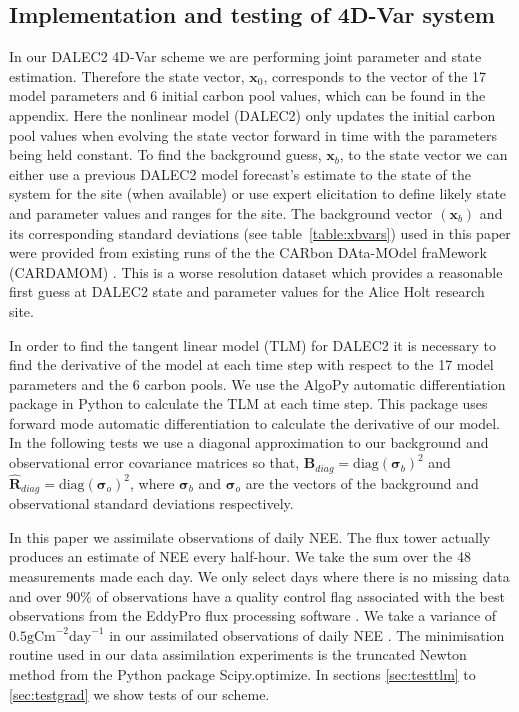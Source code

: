 \documentclass[11pt]{article}
\begin{document}
\subsection{Implementation and testing of 4D-Var system}

In our DALEC2 4D-Var scheme we are performing joint parameter and state estimation. Therefore the state vector, $\textbf{x}_0$, corresponds to the vector of the 17 model parameters and 6 initial carbon pool values, which can be found in the appendix. Here the nonlinear model (DALEC2) only updates the initial carbon pool values when evolving the state vector forward in time with the parameters being held constant. To find the background guess, $\textbf{x}_{b}$, to the state vector we can either use a previous DALEC2 model forecast's estimate to the state of the system for the site (when available) or use expert elicitation to define likely state and parameter values and ranges for the site. The background vector $(\textbf{x}_b)$ and its corresponding standard deviations (see table~\ref{table:xbvars}) used in this paper were provided from existing runs of the the CARbon DAta-MOdel fraMework (CARDAMOM) \citep{Exbrayat2015}. This is a worse resolution dataset which provides a reasonable first guess at DALEC2 state and parameter values for the Alice Holt research site.

In order to find the tangent linear model (TLM) for DALEC2 it is necessary to find the derivative of the model at each time step with respect to the 17 model parameters and the 6 carbon pools. We use the AlgoPy automatic differentiation package \citep{Walter2013} in Python to calculate the TLM at each time step. This package uses forward mode automatic differentiation to calculate the derivative of our model. In the following tests we use a diagonal approximation to our background and observational error covariance matrices so that, 
$\textbf{B}_{diag}=\text{diag}(\bm{\sigma}_b)^2$ and $\hat{\textbf{R}}_{diag}=\text{diag}(\bm{\sigma}_o )^2$,
where $\bm{\sigma}_b$ and $\bm{\sigma}_o$ are the vectors of the background and observational standard deviations respectively. 

In this paper we assimilate observations of daily NEE. The flux tower actually produces an estimate of NEE every half-hour. We take the sum over the 48 measurements made each day. We only select days where there is no missing data and over $90\% $ of observations have a quality control flag associated with the best observations from the EddyPro flux processing software \citep{eddypro}. We take a variance of $0.5\text{gCm}^{-2}\text{day}^{-1}$ in our assimilated observations of daily NEE \citep{williams2005improved}. The minimisation routine used in our data assimilation experiments is the truncated Newton method \citep{Nocedal1999} from the Python package Scipy.optimize. In sections \ref{sec:testtlm} to \ref{sec:testgrad} we show tests of our scheme. 
\end{document}
